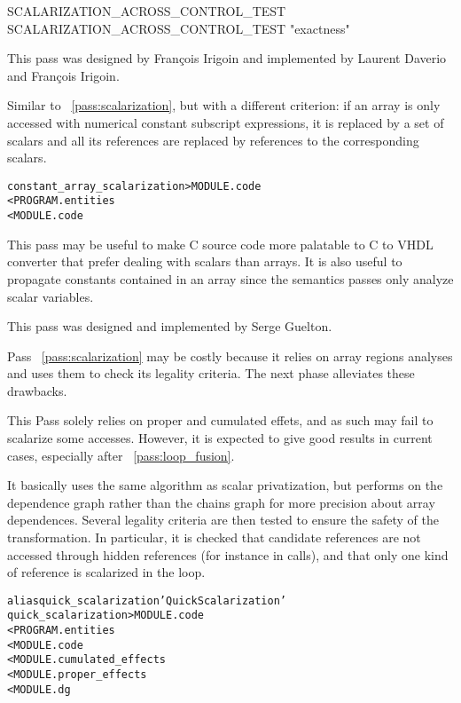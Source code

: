 \documentclass[a4paper]{report}
\newenvironment{PipsMake}{\begin{alltt}}{\end{alltt}}
\newcommand{\PipsPassRef}[1]{\texttt{\detokenize{#1}}~\ref{pass:#1}}
\newenvironment{PipsPass}[1]{\label{pass:#1}}{}
\begin{document}
\begin{PipsProp}{SCALARIZATION_ACROSS_CONTROL_TEST}
SCALARIZATION_ACROSS_CONTROL_TEST "exactness"
\end{PipsProp}


This pass was designed by Fran\c{c}ois Irigoin and implemented by
Laurent Daverio and Fran\c{c}ois Irigoin.

\begin{PipsPass}{constant_array_scalarization}
  Similar to \PipsPassRef{scalarization}, but with a different
  criterion: if an array is only accessed with numerical constant subscript
  expressions, it is replaced by a set of scalars and all its
  references are replaced by references to the corresponding scalars.
\end{PipsPass}
\begin{PipsMake}
constant_array_scalarization > MODULE.code
        < PROGRAM.entities
        < MODULE.code
\end{PipsMake}

This pass may be useful to make C source code more palatable to C to VHDL
converter that prefer dealing with scalars than arrays. It is also useful
to propagate constants contained in an array since the semantics passes
only analyze scalar variables.


This pass was designed and implemented by Serge Guelton.

Pass \PipsPassRef{scalarization} may be costly because it relies on
array regions analyses and uses them to check its legality
criteria. The next phase alleviates these drawbacks.

\begin{PipsPass}{quick_scalarization}
  This Pass solely relies on proper and cumulated effets, and as such
  may fail to scalarize some accesses. However, it is expected to give
  good results in current cases, especially after
  \PipsPassRef{loop_fusion}.

  It basically uses the same algorithm as scalar privatization, but
  performs on the dependence graph rather than the chains graph for
  more precision about array dependences. Several legality criteria
  are then tested to ensure the safety of the transformation. In
  particular, it is checked that candidate references are not accessed
  through hidden references (for instance in calls), and that only one
  kind of reference is scalarized in the loop.
\end{PipsPass}


\begin{PipsMake}
alias quick_scalarization 'Quick Scalarization'
quick_scalarization  > MODULE.code
        < PROGRAM.entities
        < MODULE.code
        < MODULE.cumulated_effects
        < MODULE.proper_effects
        < MODULE.dg
\end{PipsMake}
\end{document}
